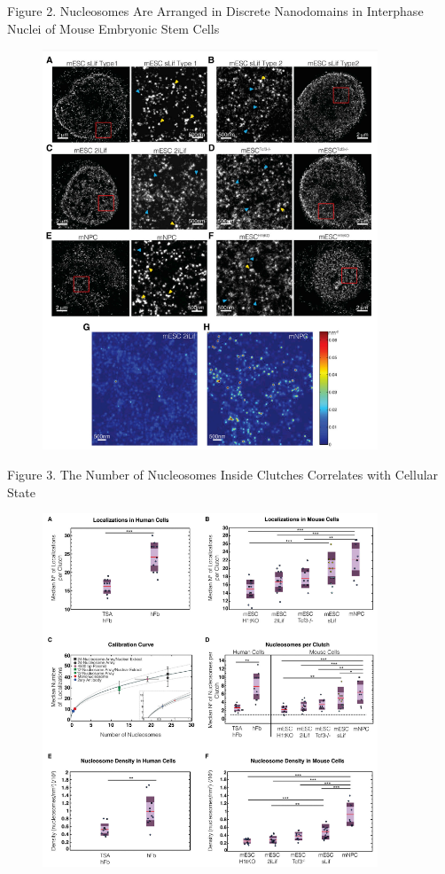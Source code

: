 \documentclass{beamer}			%
\begin{document}
\begin{frame}{Figure 2. Nucleosomes Are Arranged in Discrete Nanodomains in Interphase Nuclei of Mouse Embryonic Stem Cells}
\begin{figure}
\includegraphics[width=10cm]{Figure-2.png}
\end{figure}
\end{frame}

\begin{frame}{Figure 3. The Number of Nucleosomes Inside Clutches Correlates with Cellular State}
\begin{figure}
\includegraphics[width=10cm]{Figure-3.png}
\end{figure}
\end{frame}
\end{document}

